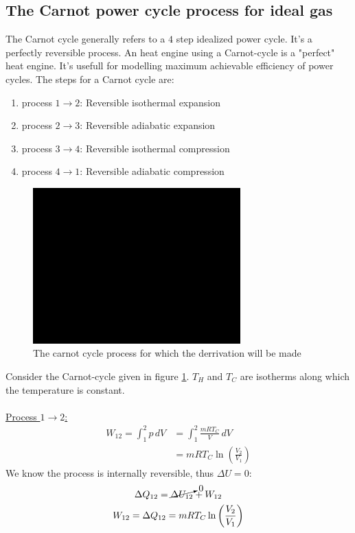 \documentclass[11pt, a4paper]{article}
\begin{document}
\subsection{The Carnot power cycle process for ideal gas}
The Carnot cycle generally refers to a $4$ step idealized power cycle. It's a perfectly reversible process. An heat engine using a Carnot-cycle is a "perfect" heat engine. It's usefull for modelling maximum achievable efficiency of power cycles. The steps for a Carnot cycle are:
\begin{enumerate}
  \item process $1 \to 2$: Reversible isothermal expansion
  \item process $2 \to 3$: Reversible adiabatic expansion
  \item process $3 \to 4$: Reversible isothermal compression
  \item process $4 \to 1$: Reversible adiabatic compression
\end{enumerate}
\begin{figure}[h]
  \centerline{\includegraphics[width=80mm]{images/placeholder.png}}
  \caption{The carnot cycle process for which the derrivation will be made}
  \label{fig:Carnot_cycle}
\end{figure}
Consider the Carnot-cycle given in figure \ref{fig:Carnot_cycle}. $T_H$ and $T_C$ are isotherms along which the temperature is constant.\\
\\ 
\underline{Process $1 \to 2$:}
\begin{align}
  W_{12} = \int_1^2 p\,dV &= \int_1^2 \frac{mRT_C}{V}\,dV\\
                          &= mRT_C \ln \left( \frac{V_2}{V_1} \right)
\end{align}
We know the process is internally reversible, thus $\Delta U =0$:
\begin{gather}
  \Delta Q_{12} = \cancelto{0}{\Delta U_{12}} + W_{12}\\
  W_{12} = \Delta Q_{12} = mRT_C \ln \left( \frac{V_2}{V_1} \right)
\end{gather}\\
\end{document}

